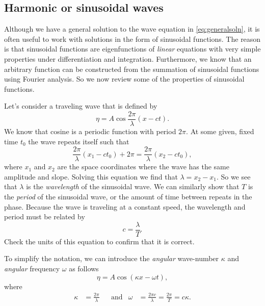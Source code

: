 \documentclass[11pt,twoside,a4paper]{article}
\begin{document}
\subsection{Harmonic or sinusoidal waves}

Although we have a general solution to the wave equation in
\autoref{eq:generalsoln}, it is often useful to work with solutions in
the form of sinusoidal functions.  The reason is that sinusoidal
functions are eigenfunctions of \textit{linear} equations with very
simple properties under differentiation and integration.  Furthermore,
we know that an arbitrary function can be constructed from the
summation of sinusoidal functions using Fourier analysis.  So we now
review some of the properties of sinusoidal functions. 

Let's consider a traveling wave that is defined by
\begin{equation}
  \label{eq:3}
  \eta = A \cos \frac{2\pi}{\lambda}(x-ct).
\end{equation}
We know that cosine is a periodic function with period $2\pi$.  At
some given, fixed time $t_0$ the wave repeats itself such that
\begin{equation}
  \label{eq:1}
  \frac{2\pi}{\lambda}(x_1-ct_0) + 2\pi = \frac{2\pi}{\lambda}(x_2-ct_0),
\end{equation}
where $x_1$ and $x_2$ are the space coordinates where the wave has the
same amplitude and slope.  Solving this equation we find that
$\lambda = x_2-x_1$. So we see that $\lambda$ is the
\textit{wavelength} of the sinusoidal wave.  We can similarly show
that $T$ is the \textit{period} of the sinusoidal wave, or the amount
of time between repeats in the phase.  Because the wave is traveling
at a constant speed, the wavelength and period must be related by
\begin{equation}
  \label{eq:clt}
  c = \frac{\lambda}{T}.
\end{equation}
Check the units of this equation to confirm that it is correct.

To simplify the notation, we can introduce the \textit{angular}
wave-number $\kappa$ and \textit{angular} frequency $\omega$ as
follows
\begin{displaymath}
  \eta = A \cos(\kappa x - \omega t),
\end{displaymath}
where
\begin{align}
  \kappa &= \frac{2\pi}{\lambda} & &\text{and} & 
                                                 \omega &= \frac{2\pi c}{\lambda} = \frac{2\pi}{T} = c\kappa.
\end{align}
\end{document}
